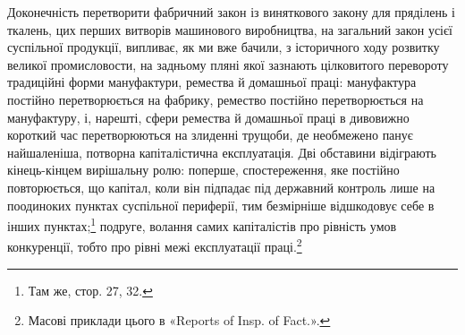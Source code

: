 Доконечність перетворити фабричний закон із виняткового
закону для пряділень і ткалень, цих перших витворів машинового
виробництва, на загальний закон усієї суспільної продукції, випливає,
як ми вже бачили, з історичного ходу розвитку великої промисловости,
на задньому пляні якої зазнають цілковитого перевороту
традиційні форми мануфактури, ремества й домашньої
праці: мануфактура постійно перетворюється на фабрику, ремество
постійно перетворюється на мануфактуру, і, нарешті,
сфери ремества й домашньої праці в дивовижно короткий час
перетворюються на злиденні трущоби, де необмежено панує найшаленіша,
потворна капіталістична експлуатація. Дві обставини
відіграють кінець-кінцем вирішальну ролю: поперше, спостереження,
яке постійно повторюється, що капітал, коли він підпадає
під державний контроль лише на поодиноких пунктах
суспільної периферії, тим безмірніше відшкодовує себе в інших
пунктах;\footnote{
Там же, стор. 27, 32.
} подруге, волання самих капіталістів про рівність
умов конкуренції, тобто про рівні межі експлуатації праці.\footnote{
Масові приклади цього в «Reports of Insp. of Fact.».
}
\parbreak{}  %
